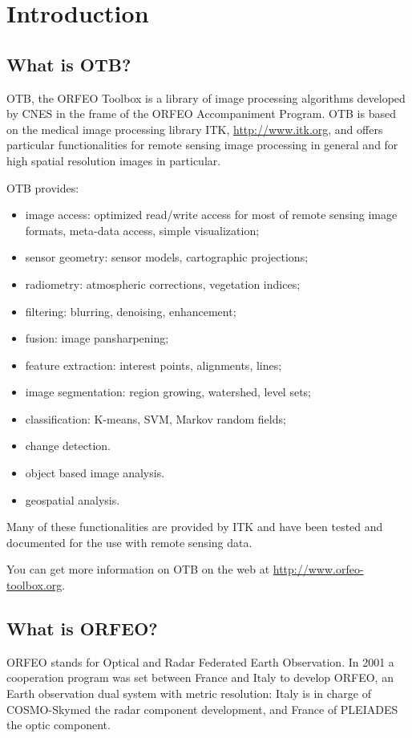 \section{Introduction}
\subsection{What is OTB?}
OTB, the ORFEO Toolbox is a library of image processing algorithms developed by CNES in the
frame of the ORFEO Accompaniment Program.
OTB is based on the medical image processing library ITK, \url{http://www.itk.org}, and offers
particular functionalities for remote sensing image processing in
general and for high spatial resolution images in particular.

OTB provides:
\begin{itemize}
\item image access: optimized read/write access for most of remote sensing
image formats, meta-data access, simple visualization;
\item sensor geometry: sensor models, cartographic projections;
\item radiometry: atmospheric corrections, vegetation indices;
\item filtering: blurring, denoising, enhancement;
\item fusion: image pansharpening;
\item feature extraction: interest points, alignments, lines;
\item image segmentation: region growing, watershed, level sets;
\item classification: K-means, SVM, Markov random fields;
\item change detection.
\item object based image analysis.
\item geospatial analysis.
\end{itemize}


Many of these functionalities are provided by ITK and have been tested
and documented for the use with remote sensing data.

You can get more information on OTB on the web at \url{http://www.orfeo-toolbox.org}.

\subsection{What is ORFEO?}
ORFEO stands for Optical and Radar Federated Earth Observation.  In
2001 a cooperation program was set between France and Italy to develop
ORFEO, an Earth observation dual system with metric resolution: Italy
is in charge of COSMO-Skymed the radar component development, and
France of PLEIADES the optic component.

